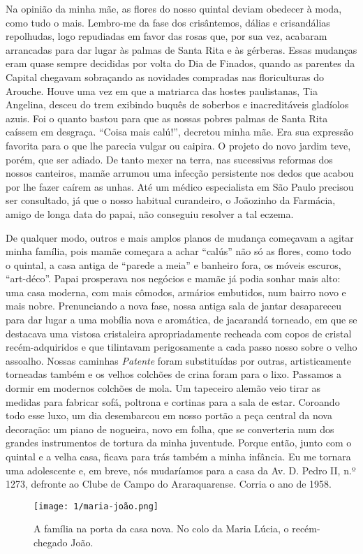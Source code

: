 Na opinião da minha mãe, as flores do nosso quintal deviam obedecer à moda, como tudo o mais. 
Lembro-me da fase dos crisântemos, dálias e crisandálias repolhudas, logo repudiadas em favor das rosas que, por sua vez, acabaram arrancadas para dar lugar às palmas de Santa Rita e às gérberas. 
Essas mudanças eram quase sempre decididas por volta do Dia de Finados, quando as parentes da Capital chegavam sobraçando as novidades compradas nas floriculturas do Arouche. 
Houve uma vez em que a matriarca das hostes paulistanas, Tia Angelina, desceu do trem exibindo buquês de soberbos e inacreditáveis gladíolos azuis. Foi o quanto bastou para que as nossas pobres palmas de Santa Rita caíssem em desgraça. 
“Coisa mais calú!”, decretou minha mãe. 
Era sua expressão favorita para o que lhe parecia vulgar ou caipira. O projeto do novo jardim teve, porém, que ser adiado. 
De tanto mexer na terra, nas sucessivas reformas dos nossos canteiros, mamãe arrumou uma infecção persistente nos dedos que acabou por lhe fazer caírem as unhas. 
Até um médico especialista em São Paulo precisou ser consultado, já que o nosso habitual curandeiro, o Joãozinho da Farmácia, amigo de longa data do papai, não conseguiu resolver a tal eczema.

De qualquer modo, outros e mais amplos planos de mudança começavam a agitar minha família, pois mamãe começara a achar “calús” não só as flores, como todo o quintal, a casa antiga de “parede a meia” e banheiro fora, os móveis escuros, “art-déco”. 
Papai prosperava nos negócios e mamãe já podia sonhar mais alto: uma casa moderna, com mais cômodos, armários embutidos, num bairro novo e mais nobre. 
Prenunciando a nova fase, nossa antiga sala de jantar desapareceu para dar lugar a uma mobília nova e aromática, de jacarandá torneado, em que se destacava uma vistosa cristaleira apropriadamente recheada com copos de cristal recém-adquiridos e que tilintavam perigosamente a cada passo nosso sobre o velho assoalho. 
Nossas caminhas \textit{Patente} foram substituídas por outras, artisticamente torneadas também e os velhos colchões de crina foram para o lixo. 
Passamos a dormir em modernos colchões de mola. Um tapeceiro alemão veio tirar as medidas para fabricar sofá, poltrona e cortinas para a sala de estar. 
Coroando todo esse luxo, um dia desembarcou em nosso portão a peça central da nova decoração: um piano de nogueira, novo em folha, que se converteria num dos grandes instrumentos de tortura da minha juventude. 
Porque então, junto com o quintal e a velha casa, ficava para trás também a minha infância. 
Eu me tornara uma adolescente e, em breve, nós mudaríamos para a casa da Av. D. Pedro II, n.º 1273, defronte ao Clube de Campo do Araraquarense. Corria o ano de 1958.

\begin{figure}[H]
\centering
\texttt{[image: 1/maria-joão.png]}
\caption{A família na porta da casa nova. No colo da
Maria Lúcia, o recém-chegado João.}
\end{figure}